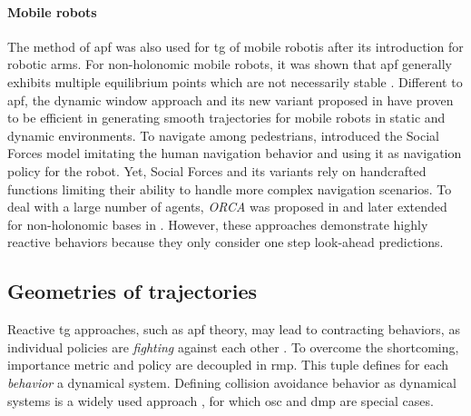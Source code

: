 \paragraph{Mobile robots}

The method of \ac{apf} was also used for \ac{tg} of mobile
robotis after its introduction for robotic arms.
For non-holonomic mobile robots, it was shown that \ac{apf}
generally exhibits multiple equilibrium points which are not
necessarily stable \cite{urakubo2018stability}.
Different to \ac{apf}, the dynamic window approach
\cite{Fox1997} and its new variant proposed in
\cite{Zhang2019} have proven to be efficient in generating
smooth trajectories for mobile robots in static and dynamic
environments. To navigate among pedestrians,
\cite{Ferrer2013} introduced the Social Forces model
imitating the human navigation behavior and using it as
navigation policy for the robot.  Yet, Social Forces and its
variants rely on handcrafted functions limiting their
ability to handle more complex navigation scenarios. To deal
with a large number of agents, \textit{ORCA} was proposed in
\cite{VanDenBerg2011} and later extended for non-holonomic
bases in \cite{Alonso-Mora2012a}. However, these approaches
demonstrate highly reactive behaviors because they only
consider one step look-ahead predictions.



%

\subsection{Geometries of trajectories}
\label{sec:geometries_of_trajectories}

Reactive \ac{tg} approaches, such as \ac{apf} theory,
may lead to contracting behaviors, as individual policies
are \textit{fighting} against each other \cite{Ratliff2018}.
To overcome the shortcoming, importance metric and policy
are decoupled in \ac{rmp}. This tuple defines
for each \textit{behavior} a dynamical system.
Defining collision avoidance behavior as dynamical systems
is a widely used approach
\cite{khansari2012dynamical,huber2023avoidance}, for which
\ac{osc} \cite{Khatib1987a} and \ac{dmp}
\cite{ijspeert2013dynamical} are special cases.


